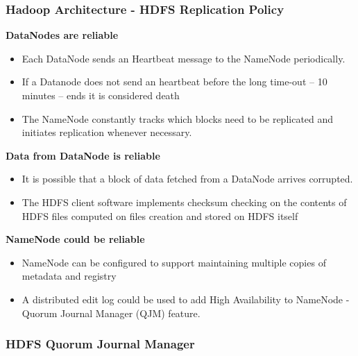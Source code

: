 \subsubsection{Hadoop Architecture - HDFS Replication Policy}

\textbf{DataNodes are reliable}
\begin{itemize}
	\item Each DataNode sends an Heartbeat message to the NameNode periodically.
	\item If a Datanode does not send an heartbeat before the long time-out – 10 minutes – ends it is considered death
	\item The NameNode constantly tracks which blocks need to be replicated and initiates replication whenever necessary.
\end{itemize}

\textbf{Data from DataNode is reliable}
\begin{itemize}
	\item It is possible that a block of data fetched from a DataNode arrives corrupted.
	\item The HDFS client software implements checksum checking on the contents of HDFS files computed on files creation and stored on HDFS itself
\end{itemize}

\textbf{NameNode could be reliable}
\begin{itemize}
	\item NameNode can be configured to support maintaining multiple copies of metadata and registry
	\item A distributed edit log could be used to add High Availability to NameNode - Quorum Journal Manager (QJM) feature.
\end{itemize}

\subsubsection{HDFS Quorum Journal Manager}


